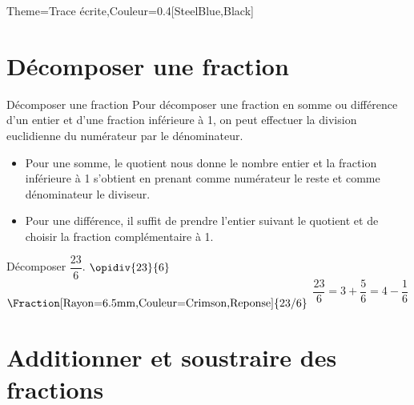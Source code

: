\begin{Maquette}[Cours]{Theme={Trace écrite},Couleur={0.4[SteelBlue,Black]}}

   \section{Décomposer une fraction}
  
      \begin{methode*}{Décomposer une fraction}
         Pour décomposer une fraction en somme ou différence d'un entier et d'une fraction inférieure à 1, on peut effectuer la division euclidienne du numérateur par le dénominateur. 
         \begin{itemize}
            \item Pour une somme, le quotient nous donne le nombre entier et la fraction inférieure à 1 s'obtient en prenant comme numérateur le reste et comme dénominateur le diviseur.
            \item Pour une différence, il suffit de prendre l'entier suivant le quotient et de choisir la fraction complémentaire à 1.
         \end{itemize}
         \begin{exbmethode}
            Décomposer $\dfrac{23}{6}$.
            \tcblower
               $\opidiv{23}{6}$
               \qquad $\raisebox{-4mm}{\Fraction[Rayon=6.5mm,Couleur=Crimson,Reponse]{23/6}}$
               \qquad $\dfrac{23}{6} =3+\dfrac56 =4-\dfrac16$
            \end{exbmethode}
      \end{methode*}


   \section{Additionner et soustraire des fractions} %


\end{Maquette}
